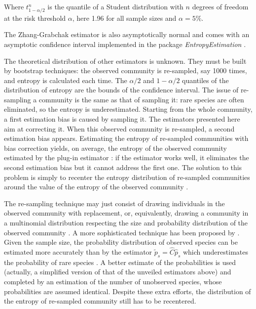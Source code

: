 \documentclass[fleqn,10pt]{latex/stylish_article} %
\begin{document}
Where \(t^{n}_{1-\alpha/2}\) is the quantile of a Student distribution with \(n\) degrees of freedom at the risk threshold \(\alpha\), here 1.96 for all sample sizes and \(\alpha=5\%\).

The Zhang-Grabchak estimator is also asymptotically normal and comes with an asymptotic confidence interval \citep{Zhang2014} implemented in the package \emph{EntropyEstimation} \citep{Cao2014}.

The theoretical distribution of other estimators is unknown.
They must be built by bootstrap techniques: the observed community is re-sampled, say 1000 times, and entropy is calculated each time.
The \(\alpha/2\) and \(1-\alpha/2\) quantiles of the distribution of entropy are the bounds of the confidence interval.
The issue of re-sampling a community is the same as that of sampling it: rare species are often eliminated, so the entropy is underestimated.
Starting from the whole community, a first estimation bias is caused by sampling it.
The estimators presented here aim at correcting it.
When this observed community is re-sampled, a second estimation bias appears.
Estimating the entropy of re-sampled communities with bias correction yields, on average, the entropy of the observed community estimated by the plug-in estimator \citep{Marcon2012a}: if the estimator works well, it eliminates the second estimation bias but it cannot address the first one.
The solution to this problem is simply to recenter the entropy distribution of re-sampled communities around the value of the entropy of the observed community \citep{Marcon2012a, Chao2015}.

The re-sampling technique may just consist of drawing individuals in the observed community with replacement, or, equivalently, drawing a community in a multinomial distribution respecting the size and probability distribution of the observed community \citep{Marcon2014a}.
A more sophisticated technique has been proposed by \citet{Chao2015}.
Given the sample size, the probability distribution of observed species can be estimated more accurately than by the estimator \(\tilde{p}_s = \hat{C} \hat{p}_s\) which underestimates the probability of rare species \citep{Chao2014c}.
A better estimate of the probabilities is used (actually, a simplified version of that of the unveiled estimators above) and completed by an estimation of the number of unobserved species, whose probabilities are assumed identical.
Despite these extra efforts, the distribution of the entropy of re-sampled community still has to be recentered.
\end{document}
